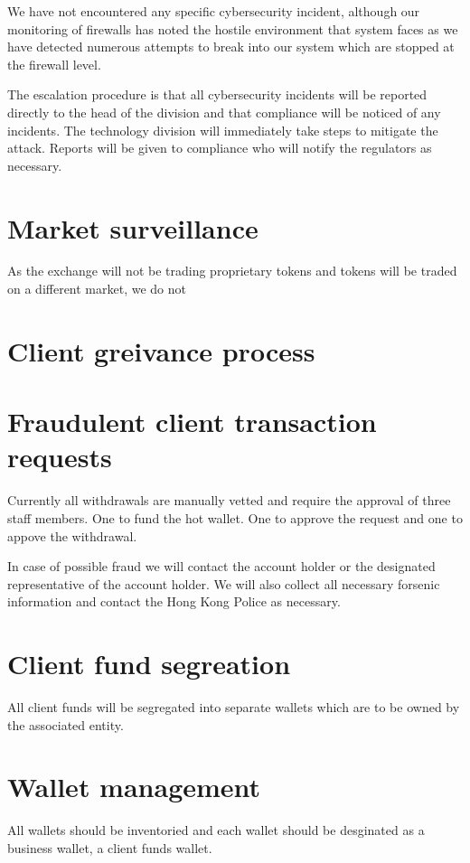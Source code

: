 We have not encountered any specific cybersecurity incident, although
our monitoring of firewalls has noted the hostile environment that
system faces as we have detected numerous attempts to break into our
system which are stopped at the firewall level.

The escalation procedure is that all cybersecurity incidents will be
reported directly to the head of the division and that compliance will
be noticed of any incidents.  The technology division will immediately
take steps to mitigate the attack.  Reports will be given to
compliance who will notify the regulators as necessary.


\section{Market surveillance}

As the exchange will not be trading proprietary tokens and tokens will
be traded on a different market, we do not 

\section{Client greivance process}

\section{Fraudulent client transaction requests}
Currently all withdrawals are manually vetted and require the approval
of three staff members.  One to fund the hot wallet.  One to approve
the request and one to appove the withdrawal.

In case of possible fraud we will contact the account holder or the
designated representative of the account holder.  We will also collect
all necessary forsenic information and contact the Hong Kong Police as
necessary.


\section{Client fund segreation}
All client funds will be segregated into separate wallets which are to
be owned by the associated entity.

\section{Wallet management}
All wallets should be inventoried and each wallet should be desginated
as a business wallet, a client funds wallet.

